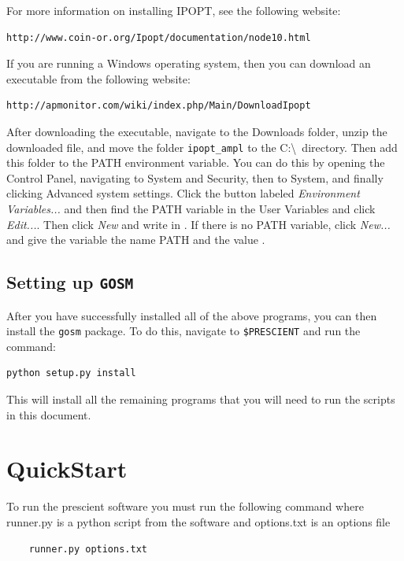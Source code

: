 \documentclass[11pt]{article}
\begin{document}
For more information on installing IPOPT, see the following website:
\begin{verbatim}
http://www.coin-or.org/Ipopt/documentation/node10.html
\end{verbatim}
If you are running a Windows operating system, then you can download an executable from the following website:
\begin{verbatim}
http://apmonitor.com/wiki/index.php/Main/DownloadIpopt
\end{verbatim}
After downloading the executable, navigate to the Downloads folder, unzip the downloaded file, and move the folder \texttt{ipopt\_ampl} to the C:\textbackslash\ directory. Then add this folder to the PATH environment variable. You can do this by opening the Control Panel, navigating to System and Security, then to System, and finally clicking Advanced system settings. Click the button labeled \emph{Environment Variables...} and then find the PATH variable in the User Variables and click \emph{Edit...}. Then click {\it New} and write in . If there is no PATH variable, click \emph{New...} and give the variable the name PATH  and the value .

\subsection{Setting up \texttt{GOSM}}
After you have successfully installed all of the above programs, you can then install the \texttt{gosm} package. To do this, navigate to \texttt{\$PRESCIENT} and run the command:
\begin{verbatim}
python setup.py install
\end{verbatim}
This will install all the remaining programs that you will need to run the scripts in this document.\\

\section{QuickStart}
To run the prescient software you must run the following command where runner.py is a python script from the software and options.txt is an options file
\begin{center}
	\begin{verbatim}
	runner.py options.txt
	\end{verbatim}
\end{center}
\end{document}
